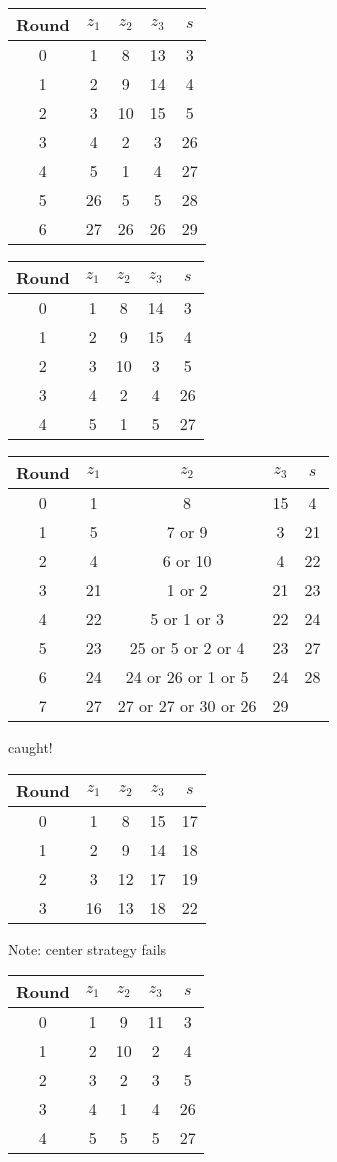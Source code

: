 \begin{tabular}{c | c | c | c | c }
Round & $z_1$ & $z_2$ & $z_3$ & $s$ \\
\hline
0 & 1 & 8 & 13 & 3 \\
1 & 2 & 9 & 14 & 4 \\
2 & 3 & 10 & 15 & 5 \\
3 & 4 & 2 & 3 & 26 \\
4 & 5 & 1 & 4 & 27 \\
5 & 26 & 5 & 5 & 28 \\
6 & 27 & 26 & 26 & 29
\end{tabular}

\begin{tabular}{c | c | c | c | c }
Round & $z_1$ & $z_2$ & $z_3$ & $s$ \\
\hline
0 & 1 & 8 & 14 & 3 \\
1 & 2 & 9 & 15 & 4 \\
2 & 3 & 10 & 3 & 5 \\
3 & 4 & 2 & 4 & 26 \\
4 & 5 & 1 & 5 & 27
\end{tabular}

\begin{tabular}{c | c | c | c | c }
Round & $z_1$ & $z_2$ & $z_3$ & $s$ \\
\hline
0 & 1 & 8 & 15 & 4 \\
1 & 5 & 7 or 9 & 3 & 21 \\
2 & 4 & 6 or 10 & 4 & 22 \\
3 & 21 & 1 or 2 & 21 & 23 \\
4 & 22 & 5 or 1 or 3 & 22 & 24 \\
5 & 23 & 25 or 5 or 2 or 4 & 23 & 27 \\
6 & 24 & 24 or 26 or 1 or 5 & 24 & 28 \\
7 & 27 & 27 or 27 or 30 or 26 & 29
\end{tabular}
caught!

\begin{tabular}{c | c | c | c | c }
Round & $z_1$ & $z_2$ & $z_3$ & $s$ \\
\hline
0 & 1 & 8 & 15 & 17 \\
1 & 2 & 9 & 14 & 18 \\
2 & 3 & 12 & 17 & 19 \\
3 & 16 & 13 & 18 & 22
\end{tabular}
Note: center strategy fails


\begin{tabular}{c | c | c | c | c }
Round & $z_1$ & $z_2$ & $z_3$ & $s$ \\
\hline
0 & 1 & 9 & 11 & 3 \\
1 & 2 & 10 & 2 & 4 \\
2 & 3 & 2 & 3 & 5 \\
3 & 4 & 1 & 4 & 26 \\
4 & 5 & 5 & 5 & 27
\end{tabular}

